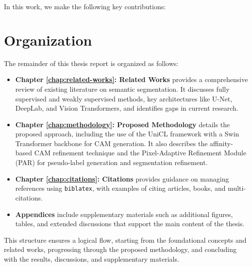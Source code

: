 In this work, we make the following key contributions:


\section{Organization}
\label{sec:organization}

The remainder of this thesis report is organized as follows:

\begin{itemize}
    \item \textbf{Chapter \ref{chap:related-works}: Related Works} provides a comprehensive review of existing literature on semantic segmentation. It discusses fully supervised and weakly supervised methods, key architectures like U-Net, DeepLab, and Vision Transformers, and identifies gaps in current research.

    \item \textbf{Chapter \ref{chap:methodology}: Proposed Methodology} details the proposed approach, including the use of the UniCL framework with a Swin Transformer backbone for CAM generation. It also describes the affinity-based CAM refinement technique and the Pixel-Adaptive Refinement Module (PAR) for pseudo-label generation and segmentation refinement.

    \item \textbf{Chapter \ref{chap:citations}: Citations} provides guidance on managing references using \texttt{biblatex}, with examples of citing articles, books, and multi-citations.

    \item \textbf{Appendices} include supplementary materials such as additional figures, tables, and extended discussions that support the main content of the thesis.
\end{itemize}

This structure ensures a logical flow, starting from the foundational concepts and related works, progressing through the proposed methodology, and concluding with the results, discussions, and supplementary materials.

